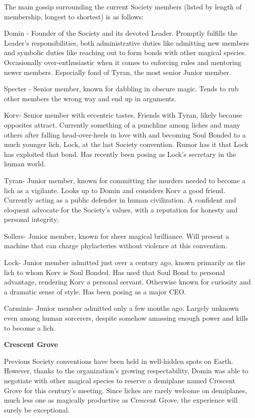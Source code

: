 \documentclass[blue]{Sel}
\begin{document}
The main gossip surrounding the current Society members (listed by length of membership, longest to shortest) is as follows:

Domin - Founder of the Society and its devoted Leader. Promptly fulfills the Leader's responsibilities, both administrative duties like admitting new members and symbolic duties like reaching out to form bonds with other magical species. Occasionally over-enthusiastic when it comes to enforcing rules and mentoring newer members. Especially fond of Tyran, the most senior Junior member.

Specter - Senior member, known for dabbling in obscure magic. Tends to rub other members the wrong way and end up in arguments.

Korv- Senior member with eccentric tastes. Friends with Tyran, likely because opposites attract. Currently something of a punchline among liches and many others after falling head-over-heels in love with and becoming Soul Bonded to a much younger lich, Lock, at the last Society convention. Rumor has it that Lock has exploited that bond. Has recently been posing as Lock's secretary in the human world.

Tyran- Junior member, known for committing the murders needed to become a lich as a vigilante. Looks up to Domin and considers Korv a good friend. Currently acting as a public defender in human civilization. A confident and eloquent advocate for the Society's values, with a reputation for honesty and personal integrity.

Sollers- Junior member, known for sheer magical brilliance. Will present a machine that can charge phylacteries without violence at this convention. 

Lock- Junior member admitted just over a century ago, known primarily as the lich to whom Korv is Soul Bonded. Has used that Soul Bond to personal advantage, rendering Korv a personal servant. Otherwise known for curiosity and a dramatic sense of style. Has been posing as a major CEO.

Carminis- Junior member admitted only a few months ago. Largely unknown even among human sorcerers, despite somehow amassing enough power and kills to become a lich.


\textbf{Crescent Grove}

Previous Society conventions have been held in well-hidden spots on Earth. However, thanks to the organization's growing respectability, Domin was able to negotiate with other magical species to reserve a demiplane named Crescent Grove for this century's meeting. Since liches are rarely welcome on demiplanes, much less one as magically productive as Crescent Grove, the experience will surely be exceptional.
\end{document}
